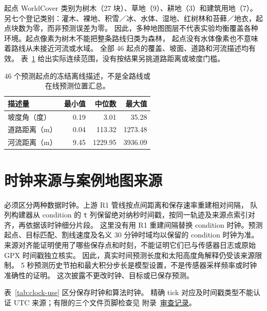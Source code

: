 起点 WorldCover 类别为树木（27 块）、草地（9）、耕地（3）和建筑用地（7）。
另七个登记类别：灌木、裸地、积雪／冰、水体、湿地、红树林和苔藓／地衣，起点块数为零，而非预测误差为零。
因此，多种地图图层不代表实验均衡覆盖各种环境。起点像素为树木不能把整条路线归类为森林，
起点没有水体像素也不意味着路线从未接近河流或水域。
全部 46 起点的覆盖、坡面、道路和河流描述均有效。
表~\ref{tab:origin-environment-range} 给出实际连续范围，没有按结果另挑道路距离或坡度门槛。

\begin{table}[htbp]
\centering\small
\caption{46 个预测起点的冻结离线描述，不是全路线或在线预测位置汇总。}
\label{tab:origin-environment-range}\hypertarget{tab:origin-environment-range}{}
\begin{tabular}{lrrr}
\toprule
描述量 & 最小值 & 中位数 & 最大值\\
\midrule
坡度角（度） & 0.19 & 3.01 & 35.28\\
道路距离（m） & 0.04 & 113.32 & 1273.48\\
河流距离（m） & 9.45 & 1229.95 & 3936.09\\
\bottomrule
\end{tabular}
\end{table}


\section{时钟来源与案例地图来源}
\label{sec:clock-and-map-provenance}\hypertarget{sec:clock-and-map-provenance}{}
必须区分两种数据时钟。上游 R1 管线按点间距离和保存速率重建相对间隔，
队列构建器从 condition 的 \texttt{t} 列保留绝对纳秒时间戳，按同一轨迹及来源点索引对齐，再依据该时钟细分片段。
这里没有用 R1 重建间隔替换 condition 时钟。预测起点、目标匹配、割线速度及名义 30 分钟时域均以保留的 condition 时钟为准。
来源对齐能证明使用了哪些保存点和时刻，不能证明它们已与传感器日志或原始 GPX 时间戳独立核实。
因此，真实时间预测长度和太阳高度角解释仍受该来源限制。
5 秒预测历史节拍和最大积分步长是模型设置，不是传感器采样频率或时钟准确性的证明。
这次披露不更改时钟、目标或已保存预测。

表~\ref{tab:clock-use} 区分保存时钟和算法时钟。
精确 tick 对应及时间戳类型不能认证 UTC 来源；有限的三个文件页脚检查见
附录~\href{audit-notes.pdf\#sec:source-reconciliation-details}{审查记录}。

